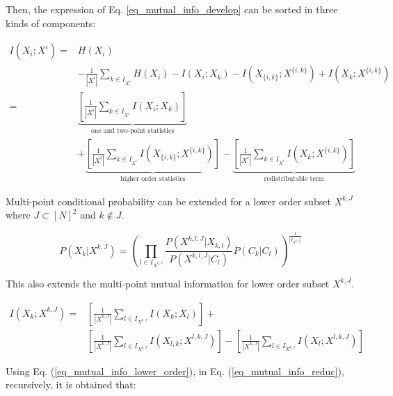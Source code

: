 Then, the expression of Eq. \eqref{eq_mutual_info_develop} can be sorted in three kinds of components:

\begin{align}
I(X_{ i };X^{ i }) =& H(X_{ i }) \nonumber\\
	  & - \frac{1}{|X^{ i }|} \sum_{k \in I_{X^{ i }}}{H(X_{ i }) - I(X_{ i };X_{ k }) - I(X_{ \{i,k\} };X^{ \{i,k\} }) + I(X_{ k };X^{ \{i,k\} })} \nonumber\\
=&  \underbrace{\left[ \frac{1}{|X^{ i }|} \sum_{k \in I_{X^{ i }}}{I(X_{ i };X_{ k })} \right]}_{\text{one and two-point statistics}}  \nonumber\\
  & + 
	\underbrace{\left[				\frac{1}{|X^{ i }|} \sum_{k \in I_{X^{ i }}}{I(X_{ \{i,k\} };X^{ \{i,k\} })}  \right]}_{\text{higher order statistics}}- 
	\underbrace{\left[				\frac{1}{|X^{ i }|} \sum_{k \in I_{X^{ i }}}{I(X_{ k };X^{ \{i,k\} })}\right]}_{\text{redistributable term}}
\label{eq_mutual_info_reduc}
\end{align}



Multi-point conditional probability can be extended for a lower order subset $X^{k,J}$ where $J\subset [N]^2 $ and $ k \notin J$.

\begin{equation}\label{eq_cm_mps_lower_order}
P(X_k|X^{k,J}) = \left( \prod_{l \in I_{X^{k,J}}}{\frac{P(X^{k,l,J}|X_{k,l})}{P(X^{k,l,J}|C_l)} {P(C_k|C_l)}}  \right) ^{\frac{1}{|I_{X^{k,J}}|}}
\end{equation}

This also extends the multi-point mutual information for lower order subset $X^{k,J}$.

\begin{align}\label{eq_mutual_info_lower_order}
I(X_k;X^{k,J}) =& \left[ \frac{1}{|X^{k,J}|} \sum_{l \in I_{X^{k,J}}}{I(X_k;X_l)} \right]  +  \nonumber\\
			    & \left[	\frac{1}{|X^{k,J}|} \sum_{l \in I_{X^{k,J}}}{I(X_{l,k};X^{l,k,J})}  \right] - 
				 \left[	\frac{1}{|X^{k,J}|} \sum_{l \in I_{X^{k,J}}}{I(X_l;X^{l,k,J})}\right] 
\end{align}

Using Eq. (\ref{eq_mutual_info_lower_order}), in Eq. (\ref{eq_mutual_info_reduc}), recursively, it is obtained that:

